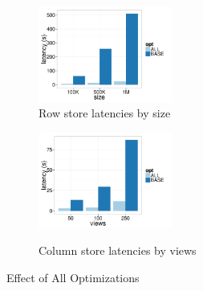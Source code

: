 \begin{figure}[h]
	\centering
	\vspace*{-10pt}
	\begin{subfigure}{0.48\linewidth}
		\centering
		\includegraphics[width=4.4cm] {Images/row_all_none_by_size.pdf}
		\vspace{-15pt}
		\caption{Row store latencies by size}
		\label{fig:row_all_none_size}
	\end{subfigure}
	\begin{subfigure}{0.48\linewidth}
		\centering
		\includegraphics[width=4.4cm] {Images/col_all_none_by_views.pdf}\
		\vspace{-15pt}
		\caption{Column store latencies by views}
		\label{fig:col_all_none_views}
	\end{subfigure}
	\vspace{-10pt}
	\caption{Effect of All Optimizations}
	\label{fig:all_opt}
	\vspace{-15pt}
\end{figure}


